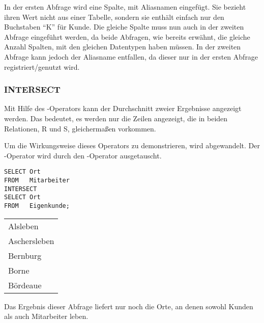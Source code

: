           In der ersten Abfrage wird eine Spalte, mit Aliasnamen  eingef\"ugt. Sie bezieht ihren Wert nicht aus einer Tabelle, sondern sie enth\"alt einfach nur den Buchstaben \enquote{K} f\"ur Kunde. Die gleiche Spalte muss nun auch in der zweiten Abfrage eingef\"uhrt werden, da beide Abfragen, wie bereits erw\"ahnt, die gleiche Anzahl Spalten, mit den gleichen Datentypen haben m\"ussen. In der zweiten Abfrage kann jedoch der Aliasname entfallen, da dieser nur in der ersten Abfrage registriert/genutzt wird.
        \subsubsection{INTERSECT}
          Mit Hilfe des -Operators kann der Durchschnitt zweier Ergebnisse angezeigt werden. Das bedeutet, es werden nur die Zeilen angezeigt, die in beiden Relationen, R und S, gleicherma\ss{}en vorkommen.

          Um die Wirkungsweise dieses Operators zu demonstrieren, wird  abgewandelt. Der -Operator wird durch den -Operator ausgetauscht.


          \begin{lstlisting}[language=oracle_sql,caption={Orte, an denen sowohl Kunden als auch Mitarbeiter leben},label=sql04_25]
SELECT Ort
FROM   Mitarbeiter
INTERSECT
SELECT Ort
FROM   Eigenkunde;
          \end{lstlisting}
\clearpage
          \begin{center}
            \begin{small}
              \tablehead{}
              \begin{msoraclesql}
                \begin{supertabular}{l}
                  Alsleben \\
                  Aschersleben \\
                  Bernburg \\
                  Borne \\
                  B\"ordeaue \\
                \end{supertabular}
              \end{msoraclesql}
            \end{small}
          \end{center}
          Das Ergebnis dieser Abfrage liefert nur noch die Orte, an denen sowohl Kunden als auch Mitarbeiter leben.
